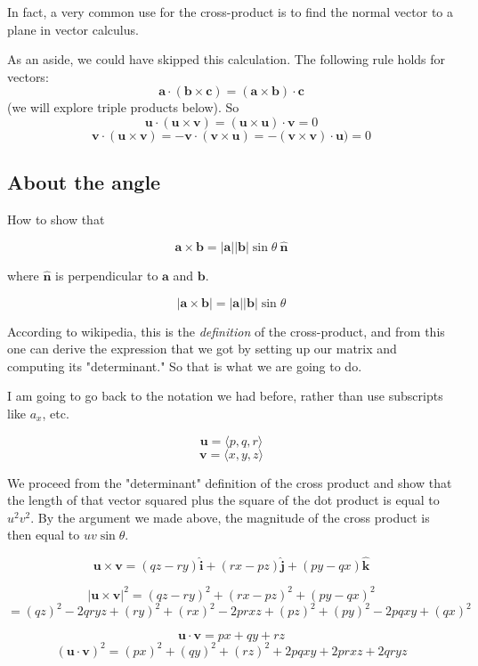 \documentclass[11pt, oneside]{article}   	%
\begin{document}
In fact, a very common use for the cross-product is to find the normal vector to a plane in vector calculus.

As an aside, we could have skipped this calculation.  The following rule holds for vectors:
\[ \mathbf{a} \cdot ( \mathbf{b} \times \mathbf{c} ) = ( \mathbf{a} \times \mathbf{b} ) \cdot \mathbf{c} \]
(we will explore triple products below).
So
\[ \mathbf{u} \cdot (\mathbf{u} \times \mathbf{v}) = (\mathbf{u} \times \mathbf{u}) \cdot \mathbf{v} = 0 \]
\[ \mathbf{v} \cdot (\mathbf{u} \times \mathbf{v}) = - \mathbf{v} \cdot (\mathbf{v} \times \mathbf{u}) = - (\mathbf{v} \times \mathbf{v}) \cdot \mathbf{u}) = 0 \]

\subsection*{About the angle}

How to show that

\[ \mathbf{a} \times \mathbf{b} = |\mathbf{a}| |\mathbf{b}| \sin \theta \ \hat{\mathbf{n}}  \]

where $\hat{\mathbf{n}}$ is perpendicular to $\mathbf{a}$ and $\mathbf{b}$.

\[ |\mathbf{a} \times \mathbf{b} | = |\mathbf{a}| |\mathbf{b}| \sin \theta \]

According to wikipedia, this is the \emph{definition} of the cross-product, and from this one can derive the expression that we got by setting up our matrix and computing its "determinant."  So that is what we are going to do.

I am going to go back to the notation we had before, rather than use subscripts like $a_x$, etc.

\[ \mathbf{u} = \langle p,q,r \rangle \]
\[ \mathbf{v} = \langle x,y,z \rangle \]

We proceed from the "determinant" definition of the cross product and show that the length of that vector squared plus the square of the dot product is equal to $u^2v^2$.  By the argument we made above, the magnitude of the cross product is then equal to $uv \sin \theta$.

\[ \mathbf{u} \times \mathbf{v}  = (qz-ry) \hat{\mathbf{i}}  + (rx-pz) \hat{\mathbf{j}} + (py-qx) \hat{\mathbf{k}}\]

\[ |\mathbf{u} \times \mathbf{v}|^2 = (qz-ry)^2 + (rx-pz)^2 + (py-qx)^2 \]
\[ = (qz)^2 - 2qryz + (ry)^2 + (rx)^2 - 2prxz + (pz)^2 + (py)^2 - 2pqxy + (qx)^2 \]


\[ \mathbf{u} \cdot \mathbf{v} = px + qy + rz \]
\[ (\mathbf{u} \cdot \mathbf{v})^2 = (px)^2 + (qy)^2 + (rz)^2 + 2pqxy + 2prxz + 2qryz \]
\end{document}
